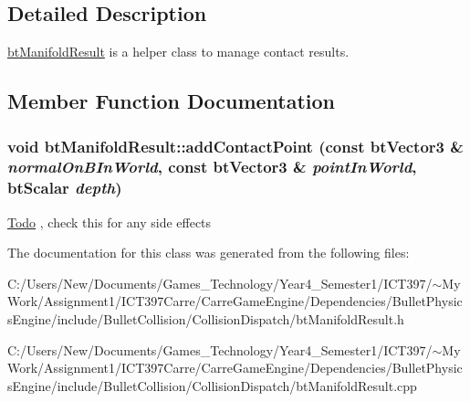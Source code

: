 \subsection{Detailed Description}
\hyperlink{classbt_manifold_result}{btManifoldResult} is a helper class to manage contact results. 

\subsection{Member Function Documentation}
\hypertarget{classbt_manifold_result_ebe32f0c202d988d0458e88d768602c6}{
\subsubsection[addContactPoint]{\setlength{\rightskip}{0pt plus 5cm}void btManifoldResult::addContactPoint (const btVector3 \& {\em normalOnBInWorld}, \/  const btVector3 \& {\em pointInWorld}, \/  btScalar {\em depth})}}
\label{classbt_manifold_result_ebe32f0c202d988d0458e88d768602c6}




\begin{Desc}
\item[\hyperlink{todo__todo000015}{Todo}], check this for any side effects \end{Desc}


The documentation for this class was generated from the following files:\begin{CompactItemize}
\item 
C:/Users/New/Documents/Games\_\-Technology/Year4\_\-Semester1/ICT397/$\sim$My Work/Assignment1/ICT397Carre/CarreGameEngine/Dependencies/BulletPhysicsEngine/include/BulletCollision/CollisionDispatch/btManifoldResult.h\item 
C:/Users/New/Documents/Games\_\-Technology/Year4\_\-Semester1/ICT397/$\sim$My Work/Assignment1/ICT397Carre/CarreGameEngine/Dependencies/BulletPhysicsEngine/include/BulletCollision/CollisionDispatch/btManifoldResult.cpp\end{CompactItemize}
